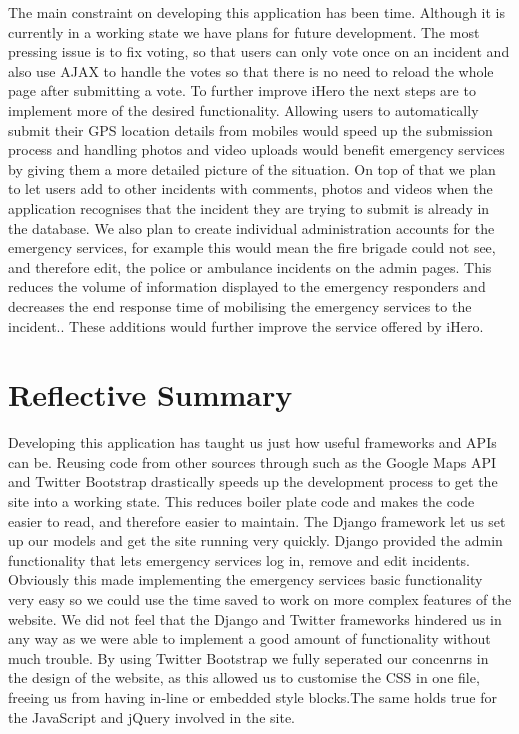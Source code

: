 \documentclass{sig-alt-release2}
\begin{document}
The main constraint on developing this application has been time. Although it is currently in a working state we have plans for future development. The most pressing issue is to fix voting, so that users can only vote once on an incident and also use AJAX to handle the votes so that there is no need to reload the whole page after submitting a vote. To further improve iHero the next steps are to implement more of the desired functionality. Allowing users to automatically submit their GPS location details from mobiles would speed up the submission process and handling photos and video uploads would benefit emergency services by giving them a more detailed picture of the situation. On top of that we plan to let users add to other incidents with comments, photos and videos when the application recognises that the incident they are trying to submit is already in the database. We also plan to create individual administration accounts for the emergency services, for example this would mean the fire brigade could not see, and therefore edit, the police or ambulance incidents on the admin pages. This reduces the volume of information displayed to the emergency responders and decreases the end response time of mobilising the emergency services to the incident.. These additions would further improve the service offered by iHero.

\newpage
\section{Reflective Summary}
Developing this application has taught us just how useful frameworks and APIs can be. Reusing code from other sources through such as the Google Maps API and Twitter Bootstrap drastically speeds up the development process to get the site into a working state. This reduces boiler plate code and makes the code easier to read, and therefore easier to maintain. The Django framework let us set up our models and get the site running very quickly. Django provided the admin functionality that lets emergency services log in, remove and edit incidents. Obviously this made implementing the emergency services basic functionality very easy so we could use the time saved to work on more complex features of the website. We did not feel that the Django and Twitter frameworks hindered us in any way as we were able to implement a good amount of functionality without much trouble. By using Twitter Bootstrap we fully seperated our concenrns in the design of the website, as this allowed us to customise the CSS in one file, freeing us from having in-line or embedded style blocks.The same holds true for the JavaScript and jQuery involved in the site.
\end{document}
